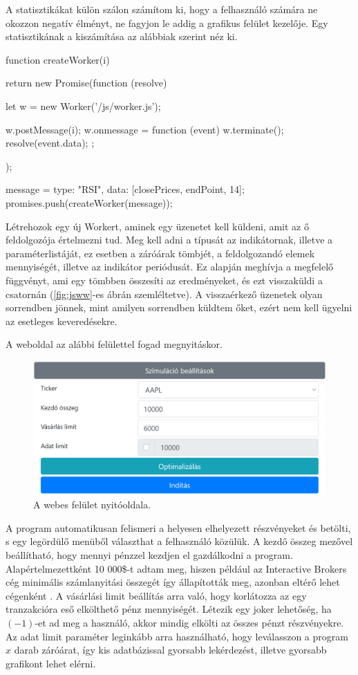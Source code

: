 A statisztikákat külön szálon számítom ki, hogy a felhasználó számára ne okozzon negatív élményt, ne fagyjon le addig a grafikus felület kezelője. Egy statisztikának a kiszámítása az alábbiak szerint néz ki.
\begin{javascript}
function createWorker(i) {
    return new Promise(function (resolve) {
        let w = new Worker('/js/worker.js');

        w.postMessage(i);
        w.onmessage = function (event) {
            w.terminate();
            resolve(event.data);
        };
    });
}

message = {type: "RSI", data: [closePrices, endPoint, 14]};
promises.push(createWorker(message));
\end{javascript}
Létrehozok egy új Workert, aminek egy üzenetet kell küldeni, amit az ő feldolgozója értelmezni tud. Meg kell adni a típusát az indikátornak, illetve a paraméterlistáját, ez esetben a záróárak tömbjét, a feldolgozandó elemek mennyiségét, illetve az indikátor periódusát. Ez alapján meghívja a megfelelő függvényt, ami egy tömbben összesíti az eredményeket, és ezt visszaküldi a csatornán (\ref{fig:jsww}-es ábrán szemléltetve). A visszaérkező üzenetek olyan sorrendben jönnek, mint amilyen sorrendben küldtem őket, ezért nem kell ügyelni az esetleges keveredésekre.

A weboldal az alábbi felülettel fogad megnyitáskor.
\begin{figure}[ht]
\centering
\includegraphics[width=\textwidth]{images/website.png}
\caption{A webes felület nyitóoldala.}
\label{fig:website}
\end{figure}
A program automatikusan felismeri a helyesen elhelyezett részvényeket és betölti, s egy legördülő menüből választhat a felhasználó közülük. A kezdő összeg mezővel beállítható, hogy mennyi pénzzel kezdjen el gazdálkodni a program. Alapértelmezettként 10 000\$-t adtam meg, hiszen például az Interactive Brokers cég minimális számlanyitási összegét így állapították meg, azonban eltérő lehet cégenként \cite{solyomi2017}. A vásárlási limit beállítás arra való, hogy korlátozza az egy tranzakcióra eső elkölthető pénz mennyiségét. Létezik egy joker lehetőség, ha $(-1)$-et ad meg a használó, akkor mindig elkölti az összes pénzt részvényekre. Az adat limit paraméter leginkább arra használható, hogy leválasszon a program $x$ darab záróárat, így kis adatbázissal gyorsabb lekérdezést, illetve gyorsabb grafikont lehet elérni.

